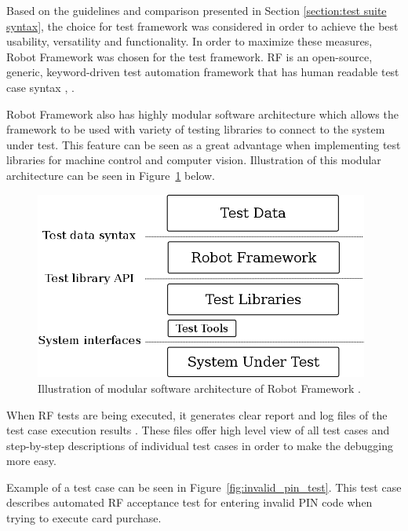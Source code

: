 Based on the guidelines and comparison presented in Section \ref{section:test suite syntax}, the choice for test framework was considered in order to achieve the best usability, versatility and functionality. In order to maximize these measures, Robot Framework was chosen for the test framework. RF is an open-source, generic, keyword-driven test automation framework that has human readable test case syntax \citep{Rfuserguide}, \citep{robotframework}.

Robot Framework also has highly modular software architecture \citep{Rfuserguide} which allows the framework to be used with variety of testing libraries to connect to the system under test. This feature can be seen as a great advantage when implementing test libraries for machine control and computer vision. Illustration of this modular architecture can be seen in Figure~\ref{fig:modular_architecture} below.

\begin{figure}[ht]
  \begin{center}
    \includegraphics[width=11cm]{images/architecture-big.png}
    \caption{Illustration of modular software architecture of Robot Framework \citep{rf-architecture}.}
    \label{fig:modular_architecture}
  \end{center}
\end{figure}
\FloatBarrier

When RF tests are being executed, it generates clear report and log files of the test case execution results \citep{Rfuserguide}. These files offer high level view of all test cases and step-by-step descriptions of individual test cases in order to make the debugging more easy.

Example of a test case can be seen in Figure~\ref{fig:invalid_pin_test}. This test case describes automated RF acceptance test for entering invalid PIN code when trying to execute card purchase.

